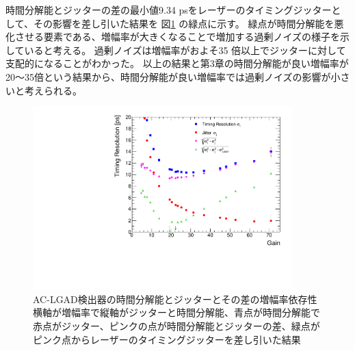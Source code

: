 時間分解能とジッターの差の最小値9.34 psをレーザーのタイミングジッターとして、その影響を差し引いた結果を 図\ref{fg:Treso_JittervsGain_Minus} の緑点に示す。
緑点が時間分解能を悪化させる要素である、増幅率が大きくなることで増加する過剰ノイズの様子を示していると考える。
過剰ノイズは増幅率がおよそ35 倍以上でジッターに対して支配的になることがわかった。
以上の結果と第3章の時間分解能が良い増幅率が20〜35倍という結果から、時間分解能が良い増幅率では過剰ノイズの影響が小さいと考えられる。

\begin{figure}[h]
    \centering
    \includegraphics[width=10cm]{fig/graph/Jitter_Treso_MultivsGain.pdf}
    \caption[AC-LGAD検出器の時間分解能とジッターとその差の増幅率依存性]{AC-LGAD検出器の時間分解能とジッターとその差の増幅率依存性\\横軸が増幅率で縦軸がジッターと時間分解能、青点が時間分解能で赤点がジッター、ピンクの点が時間分解能とジッターの差、緑点がピンク点からレーザーのタイミングジッターを差し引いた結果}
    \label{fg:Treso_JittervsGain_Minus}
\end{figure}



